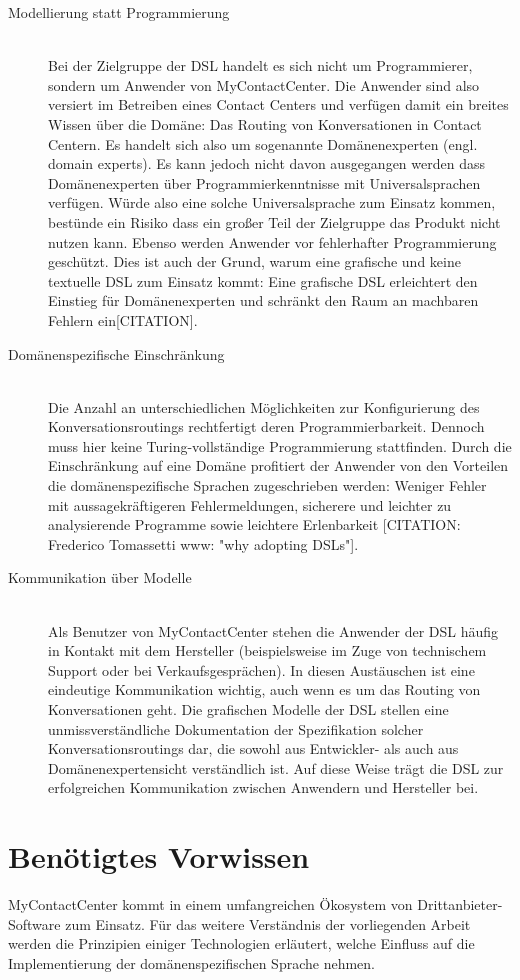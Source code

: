 \begin{description}
\item[Modellierung statt Programmierung] \hfill \\
Bei der Zielgruppe der DSL handelt es sich nicht um Programmierer, sondern um Anwender von MyContactCenter. Die Anwender sind also versiert im Betreiben eines Contact Centers und verfügen damit ein breites Wissen über die Domäne: Das Routing von Konversationen in Contact Centern. Es handelt sich also um sogenannte Domänenexperten (engl. domain experts). Es kann jedoch nicht davon ausgegangen werden dass Domänenexperten über Programmierkenntnisse mit Universalsprachen verfügen. Würde also eine solche Universalsprache zum Einsatz kommen, bestünde ein Risiko dass ein großer Teil der Zielgruppe das Produkt nicht nutzen kann. Ebenso werden Anwender vor fehlerhafter Programmierung geschützt. Dies ist auch der Grund, warum eine grafische und keine textuelle DSL zum Einsatz kommt: Eine grafische DSL erleichtert den Einstieg für Domänenexperten und schränkt den Raum an machbaren Fehlern ein[CITATION].
\item[Domänenspezifische Einschränkung] \hfill \\
Die Anzahl an unterschiedlichen Möglichkeiten zur Konfigurierung des Konversationsroutings rechtfertigt deren Programmierbarkeit. Dennoch muss hier keine Turing-vollständige Programmierung stattfinden. Durch die Einschränkung auf eine Domäne profitiert der Anwender von den Vorteilen die domänenspezifische Sprachen zugeschrieben werden: Weniger Fehler mit aussagekräftigeren Fehlermeldungen, sicherere und leichter zu analysierende Programme sowie leichtere Erlenbarkeit [CITATION: Frederico Tomassetti www: "why adopting DSLs"].
\item[Kommunikation über Modelle] \hfill \\
Als Benutzer von MyContactCenter stehen die Anwender der DSL häufig in Kontakt mit dem Hersteller (beispielsweise im Zuge von technischem Support oder bei Verkaufsgesprächen). In diesen Austäuschen ist eine eindeutige Kommunikation wichtig, auch wenn es um das Routing von Konversationen geht. Die grafischen Modelle der DSL stellen eine unmissverständliche Dokumentation der Spezifikation solcher Konversationsroutings dar, die sowohl aus Entwickler- als auch aus Domänenexpertensicht verständlich ist. Auf diese Weise trägt die DSL zur erfolgreichen Kommunikation zwischen Anwendern und Hersteller bei.
\end{description}


\section{Benötigtes Vorwissen}
MyContactCenter kommt in einem umfangreichen Ökosystem von Drittanbieter-Software zum Einsatz. Für das weitere Verständnis der vorliegenden Arbeit werden die Prinzipien einiger Technologien erläutert, welche Einfluss auf die Implementierung der domänenspezifischen Sprache nehmen. 

